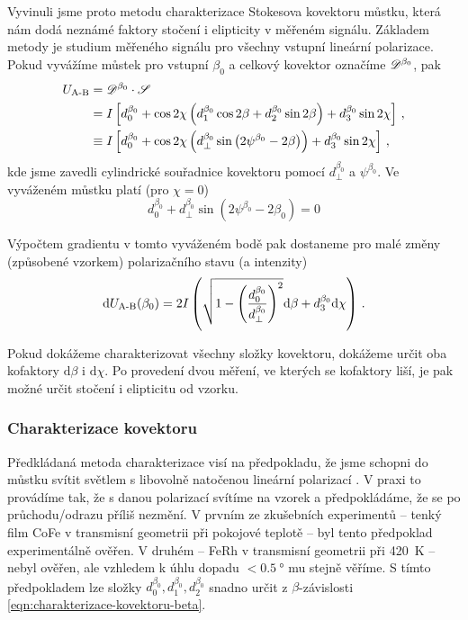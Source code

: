 Vyvinuli jsme proto metodu charakterizace Stokesova kovektoru můstku, která nám dodá neznámé faktory stočení i elipticity v měřeném signálu.
Základem metody je studium měřeného signálu pro všechny vstupní lineární polarizace.
Pokud vyvážíme můstek pro vstupní $\beta_0$ a celkový kovektor označíme $\mathscr{D}^{\beta_0}$, pak
\begin{align}
\label{eqn:charakterizace-kovektoru-beta}
    U_\textrm{A-B} &= \mathscr{D}^{\beta_0} \cdot \mathscr{S} \\ &= I \left[d^{\beta_0}_0+ \cos2\chi\left(d^{\beta_0}_1 \cos2\beta + d^{\beta_0}_2 \sin2\beta  \right) + d^{\beta_0}_3 \sin2\chi  \right] \,,\\
          &\equiv I \left[ d^{\beta_0}_0+ \cos2\chi \left(d^{\beta_0}_\perp \sin \left( 2\psi^{\beta_0} - 2\beta \right) \right) + d^{\beta_0}_3 \sin2\chi \right] \,,
\end{align}
kde jsme zavedli cylindrické souřadnice kovektoru pomocí $d^{\beta_0}_\perp$ a $\psi^{\beta_0}$.
Ve vyváženém můstku platí (pro $\chi=0$)
\begin{equation}
    d^{\beta_0}_0 + d^{\beta_0}_\perp \sin \left( 2\psi^{\beta_0} - 2\beta_0 \right) = 0
\end{equation}

Výpočtem gradientu v tomto vyváženém bodě pak dostaneme pro malé změny (způsobené vzorkem) polarizačního stavu (a intenzity)
\begin{equation}
    \textrm{d}U_\textrm{A-B}(\beta_0) = 2I \left(\sqrt{1 - \left(\frac{d^{\beta_0}_0}{d^{\beta_0}_\perp}\right)^2} \textrm{d}\beta + d^{\beta_0}_3 \textrm{d}\chi  \right) \,.
\end{equation}

Pokud dokážeme charakterizovat všechny složky kovektoru, dokážeme určit oba kofaktory $\textrm{d}\beta$ i $\textrm{d}\chi$.
Po provedení dvou měření, ve kterých se kofaktory liší, je pak možné určit stočení i elipticitu od vzorku.

\subsubsection*{Charakterizace kovektoru}

Předkládaná metoda charakterizace visí na předpokladu, že jsme schopni do můstku svítit světlem s libovolně natočenou lineární polarizací \beta.
V praxi to provádíme tak, že s danou polarizací svítíme na vzorek a předpokládáme, že se po průchodu/odrazu příliš nezmění.
V prvním ze zkušebních experimentů -- tenký film CoFe v transmisní geometrii při pokojové teplotě -- byl tento předpoklad experimentálně ověřen.
V druhém -- FeRh v transmisní geometrii při \SI{420}{\kelvin} -- nebyl ověřen, ale vzhledem k úhlu dopadu $<\SI{0.5}{\degree}$ mu stejně věříme.
S tímto předpokladem lze složky $d^{\beta_0}_0, d^{\beta_0}_1, d^{\beta_0}_2$ snadno určit z $\beta$-závislosti \eqref{eqn:charakterizace-kovektoru-beta}.



